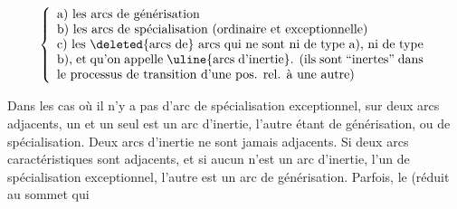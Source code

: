 \[\left\{\begin{array}{p{0.84\linewidth}}
a) les arcs de générisation \\
b) les arcs de spécialisation (ordinaire et exceptionnelle) \\
c) les \deleted{arcs de} arcs qui ne sont ni de type a), ni de type b), et qu'on appelle \uline{arcs d'inertie}. (ils sont ``inertes'' dans le processus de transition d'une pos. rel. à une autre)
\end{array}\right.\]


Dans les cas où il n'y a pas d'arc de spécialisation exceptionnel, sur deux arcs  adjacents,  un et un seul est un arc d'inertie, l'autre étant de générisation, ou de spécialisation. Deux arcs d'inertie ne sont jamais adjacents. Si deux arcs caractéristiques sont adjacents,  et si aucun n'est un arc d'inertie,  l'un  de spécialisation exceptionnel, l'autre est un arc de générisation. Parfois, le   (réduit au sommet qui
